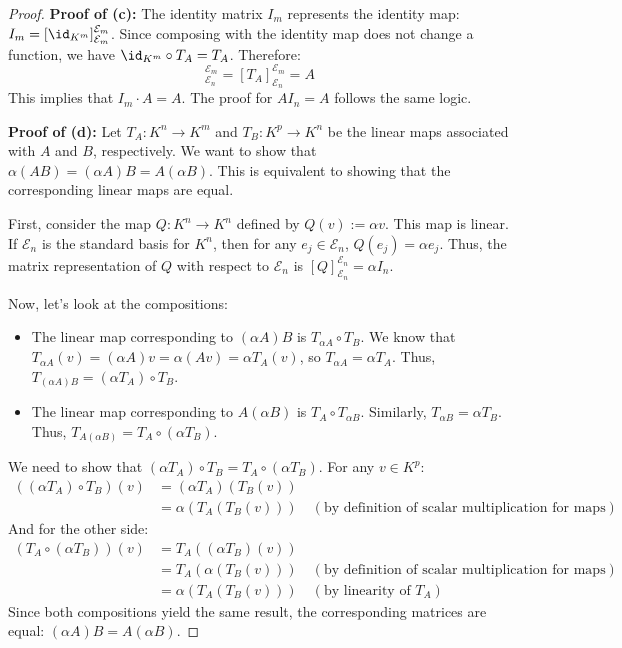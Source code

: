 \begin{proof}
\textbf{Proof of (c):} The identity matrix $I_m$ represents the identity map: $I_m = [\id_{K^m}]_{\mathcal{E}_m}^{\mathcal{E}_m}$. Since composing with the identity map does not change a function, we have $\id_{K^m} \circ T_A = T_A$. Therefore:
\begin{equation*}
    [\id_{K^m} \circ T_A]_{\mathcal{E}_n}^{\mathcal{E}_m} = [T_A]_{\mathcal{E}_n}^{\mathcal{E}_m} = A
\end{equation*}
This implies that $I_m \cdot A = A$. The proof for $A I_n = A$ follows the same logic.

\textbf{Proof of (d):} Let $T_A: K^n \to K^m$ and $T_B: K^p \to K^n$ be the linear maps associated with $A$ and $B$, respectively. We want to show that $\alpha(AB) = (\alpha A)B = A(\alpha B)$. This is equivalent to showing that the corresponding linear maps are equal.

First, consider the map $Q: K^n \to K^n$ defined by $Q(v) := \alpha v$. This map is linear. If $\mathcal{E}_n$ is the standard basis for $K^n$, then for any $e_j \in \mathcal{E}_n$, $Q(e_j) = \alpha e_j$. Thus, the matrix representation of $Q$ with respect to $\mathcal{E}_n$ is $[Q]_{\mathcal{E}_n}^{\mathcal{E}_n} = \alpha I_n$.

Now, let's look at the compositions:
\begin{itemize}
    \item The linear map corresponding to $(\alpha A)B$ is $T_{\alpha A} \circ T_B$. We know that $T_{\alpha A}(v) = (\alpha A)v = \alpha(Av) = \alpha T_A(v)$, so $T_{\alpha A} = \alpha T_A$. Thus, $T_{(\alpha A)B} = (\alpha T_A) \circ T_B$.
    \item The linear map corresponding to $A(\alpha B)$ is $T_A \circ T_{\alpha B}$. Similarly, $T_{\alpha B} = \alpha T_B$. Thus, $T_{A(\alpha B)} = T_A \circ (\alpha T_B)$.
\end{itemize}

We need to show that $(\alpha T_A) \circ T_B = T_A \circ (\alpha T_B)$. For any $v \in K^p$:
\begin{align*}
    ((\alpha T_A) \circ T_B)(v) &= (\alpha T_A)(T_B(v)) \\
    &= \alpha (T_A(T_B(v))) \quad (\text{by definition of scalar multiplication for maps})
\end{align*}
And for the other side:
\begin{align*}
    (T_A \circ (\alpha T_B))(v) &= T_A((\alpha T_B)(v)) \\
    &= T_A(\alpha (T_B(v))) \quad (\text{by definition of scalar multiplication for maps}) \\
    &= \alpha (T_A(T_B(v))) \quad (\text{by linearity of } T_A)
\end{align*}
Since both compositions yield the same result, the corresponding matrices are equal: $(\alpha A)B = A(\alpha B)$.


\end{proof}
